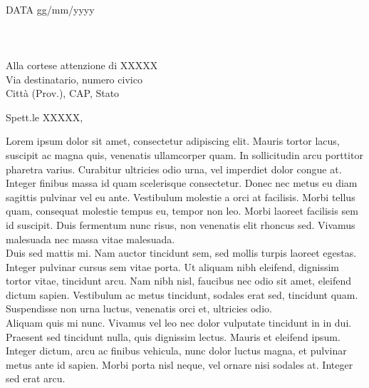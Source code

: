 \documentclass[11pt, a4paper]{letter} %
\begin{document}

\begin{letter}{
	\-\\\-
	DATA gg/mm/yyyy
	\-\\\-\\\-\\\-\\
	Alla cortese attenzione di XXXXX\\
	Via destinatario, numero civico\\
	Città (Prov.), CAP, Stato
}


\opening{Spett.le XXXXX,}

Lorem ipsum dolor sit amet, consectetur adipiscing elit. Mauris tortor lacus, suscipit ac magna quis, venenatis ullamcorper quam. In sollicitudin arcu porttitor pharetra varius. Curabitur ultricies odio urna, vel imperdiet dolor congue at. Integer finibus massa id quam scelerisque consectetur. Donec nec metus eu diam sagittis pulvinar vel eu ante. Vestibulum molestie a orci at facilisis. Morbi tellus quam, consequat molestie tempus eu, tempor non leo. Morbi laoreet facilisis sem id suscipit. Duis fermentum nunc risus, non venenatis elit rhoncus sed. Vivamus malesuada nec massa vitae malesuada.\\

Duis sed mattis mi. Nam auctor tincidunt sem, sed mollis turpis laoreet egestas. Integer pulvinar cursus sem vitae porta. Ut aliquam nibh eleifend, dignissim tortor vitae, tincidunt arcu. Nam nibh nisl, faucibus nec odio sit amet, eleifend dictum sapien. Vestibulum ac metus tincidunt, sodales erat sed, tincidunt quam. Suspendisse non urna luctus, venenatis orci et, ultricies odio.\\

Aliquam quis mi nunc. Vivamus vel leo nec dolor vulputate tincidunt in in dui. Praesent sed tincidunt nulla, quis dignissim lectus. Mauris et eleifend ipsum. Integer dictum, arcu ac finibus vehicula, nunc dolor luctus magna, et pulvinar metus ante id sapien. Morbi porta nisl neque, vel ornare nisi sodales at. Integer sed erat arcu.\\




\end{letter}
\end{document}
